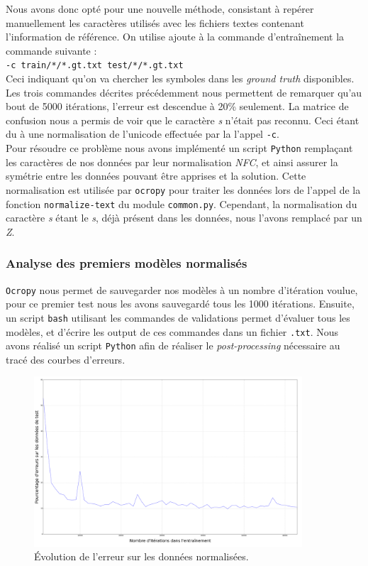 \documentclass{article}
\newenvironment{oldstyle}{%
    \renewcommand\rmdefault{jkplvos}%
  \renewcommand\sfdefault{jkpssvos}%
  \renewcommand\ttdefault{jkpttvos}%
  \normalfont
}{}
\newcommand\s{\begin{oldstyle}s\end{oldstyle}}
\begin{document}
Nous avons donc opté pour une nouvelle méthode, consistant à repérer manuellement les caractères utilisés avec les fichiers textes contenant l'information de référence.
On utilise ajoute à la commande d'entraînement la commande suivante : \\
\texttt{-c train/*/*.gt.txt test/*/*.gt.txt} \\
Ceci indiquant qu'on va chercher les symboles dans les \textit{ground truth} disponibles.
Les trois commandes décrites précédemment nous permettent de remarquer qu'au bout de 5000 itérations, l'erreur est descendue à 20\% seulement. La matrice de confusion nous a permis de voir que le caractère \textit{\s} n'était pas reconnu. Ceci étant du à une normalisation de l'unicode effectuée par la l'appel \texttt{-c}. \\
Pour résoudre ce problème nous avons implémenté un script \texttt{Python} remplaçant les caractères de nos données par leur normalisation \textit{NFC}, et ainsi assurer la symétrie entre les données pouvant être apprises et la solution. Cette normalisation est utilisée par \texttt{ocropy} pour traiter les données lors de l'appel de la fonction \texttt{normalize-text} du module \texttt{common.py}. Cependant, la normalisation du caractère \textit{\s} étant le \textit{s}, déjà présent dans les données, nous l'avons remplacé par un \textit{Z}.

\subsubsection{Analyse des premiers modèles normalisés}

\texttt{Ocropy} nous permet de sauvegarder nos modèles à un nombre d'itération voulue, pour ce premier test nous les avons sauvegardé tous les 1000 itérations. Ensuite, un script \texttt{bash} utilisant les commandes de validations permet d'évaluer tous les modèles, et d'écrire les output de ces commandes dans un fichier \texttt{.txt}. Nous avons réalisé un script \texttt{Python} afin de réaliser le \textit{post-processing} nécessaire au tracé des courbes d'erreurs.

\begin{figure}[!h] 
    \center
    \includegraphics[width=10cm]{error_normalized.png}
    \caption{Évolution de l'erreur sur les données normalisées.}
    \label{err_norm}
\end{figure}
\end{document}
